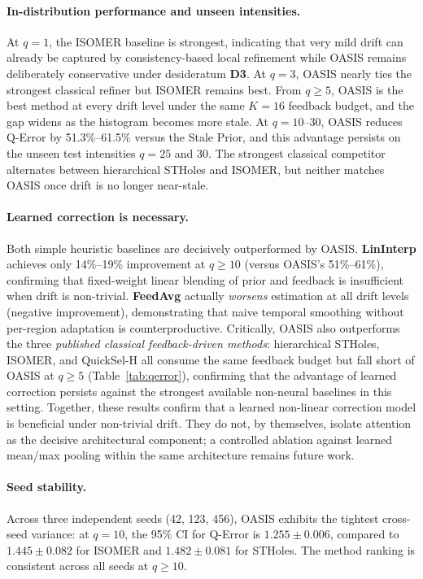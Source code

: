 \documentclass[runningheads]{llncs}
\begin{document}
\paragraph{In-distribution performance and unseen intensities.}
At $q{=}1$, the ISOMER baseline is strongest, indicating that very mild drift can already be captured by consistency-based local refinement while OASIS remains deliberately conservative under desideratum \textbf{D3}. At $q{=}3$, OASIS nearly ties the strongest classical refiner but ISOMER remains best. From $q{\geq}5$, OASIS is the best method at every drift level under the same $K{=}16$ feedback budget, and the gap widens as the histogram becomes more stale. At $q{=}10$--30, OASIS reduces Q-Error by 51.3\%--61.5\% versus the Stale Prior, and this advantage persists on the unseen test intensities $q{=}25$ and 30. The strongest classical competitor alternates between hierarchical STHoles and ISOMER, but neither matches OASIS once drift is no longer near-stale.

\paragraph{Learned correction is necessary.}
Both simple heuristic baselines are decisively outperformed by OASIS.
\textbf{LinInterp} achieves only 14\%--19\% improvement at $q{\geq}10$ (versus OASIS's 51\%--61\%), confirming that fixed-weight linear blending of prior and feedback is insufficient when drift is non-trivial.
\textbf{FeedAvg} actually \emph{worsens} estimation at all drift levels (negative improvement), demonstrating that naive temporal smoothing without per-region adaptation is counterproductive.
Critically, OASIS also outperforms the three \emph{published classical feedback-driven methods}: hierarchical STHoles, ISOMER, and QuickSel-H all consume the same feedback budget but fall short of OASIS at $q{\geq}5$ (Table~\ref{tab:qerror}), confirming that the advantage of learned correction persists against the strongest available non-neural baselines in this setting.
Together, these results confirm that a learned non-linear correction model is beneficial under non-trivial drift. They do not, by themselves, isolate attention as the decisive architectural component; a controlled ablation against learned mean/max pooling within the same architecture remains future work.

\paragraph{Seed stability.}
Across three independent seeds (42, 123, 456), OASIS exhibits the tightest cross-seed variance: at $q{=}10$, the 95\% CI for Q-Error is $1.255 \pm 0.006$, compared to $1.445 \pm 0.082$ for ISOMER and $1.482 \pm 0.081$ for STHoles. The method ranking is consistent across all seeds at $q{\geq}10$.
\end{document}
